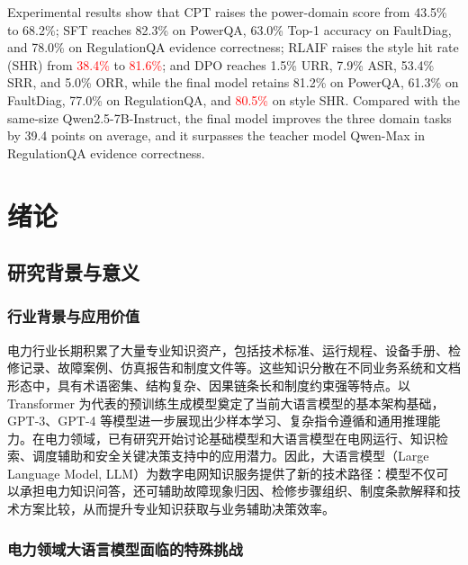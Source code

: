\documentclass[fontset=fandol,type=master,campus=shenzhen,etitleauto=true]{hithesisbook}
\newcommand{\rev}[1]{\textcolor{red}{#1}}
\begin{document}
\begin{eabstract}
Experimental results show that CPT raises the power-domain score from 43.5\% to 68.2\%; SFT reaches 82.3\% on PowerQA, 63.0\% Top-1 accuracy on FaultDiag, and 78.0\% on RegulationQA evidence correctness; RLAIF raises the style hit rate (SHR) from \rev{38.4\%} to \rev{81.6\%}; and DPO reaches 1.5\% URR, 7.9\% ASR, 53.4\% SRR, and 5.0\% ORR, while the final model retains 81.2\% on PowerQA, 61.3\% on FaultDiag, 77.0\% on RegulationQA, and \rev{80.5\%} on style SHR. Compared with the same-size Qwen2.5-7B-Instruct, the final model improves the three domain tasks by 39.4 points on average, and it surpasses the teacher model Qwen-Max in RegulationQA evidence correctness.
\end{eabstract}

\makecover
\tableofcontents

\mainmatter
\chapter{绪论}\label{ux7eeaux8bba}

\section{研究背景与意义}\label{ux7814ux7a76ux80ccux666fux4e0eux610fux4e49}

\subsection{行业背景与应用价值}

电力行业长期积累了大量专业知识资产，包括技术标准、运行规程、设备手册、检修记录、故障案例、仿真报告和制度文件等。这些知识分散在不同业务系统和文档形态中，具有术语密集、结构复杂、因果链条长和制度约束强等特点。以 Transformer 为代表的预训练生成模型奠定了当前大语言模型的基本架构基础\cite{ref1}，GPT-3、GPT-4 等模型进一步展现出少样本学习、复杂指令遵循和通用推理能力\cite{ref2,ref3}。在电力领域，已有研究开始讨论基础模型和大语言模型在电网运行、知识检索、调度辅助和安全关键决策支持中的应用潜力\cite{ref4,ref5}。因此，大语言模型（Large Language Model, LLM）为数字电网知识服务提供了新的技术路径：模型不仅可以承担电力知识问答，还可辅助故障现象归因、检修步骤组织、制度条款解释和技术方案比较，从而提升专业知识获取与业务辅助决策效率。

\subsection{电力领域大语言模型面临的特殊挑战}
\end{document}
